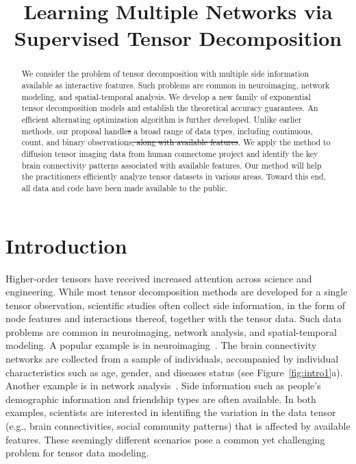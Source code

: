 \documentclass{article}
\title{Learning Multiple Networks via Supervised Tensor Decomposition}
\theoremstyle{definition}
\theoremstyle{definition}
\providecommand{\DIFaddtex}[1]{{\protect\color{blue}\uwave{#1}}} %
\providecommand{\DIFdeltex}[1]{{\protect\color{red}\sout{#1}}}                      %
\providecommand{\DIFadd}[1]{{\DIFaddtex{#1}}} %
\providecommand{\DIFdel}[1]{{\DIFdeltex{#1}}} %
\begin{document}
\maketitle

\begin{abstract}
We consider the problem of tensor decomposition with multiple side information available as interactive features. Such problems are common in neuroimaging, network modeling, and spatial-temporal analysis. We develop a new family of exponential tensor decomposition models and establish the theoretical accuracy guarantees. An efficient alternating optimization algorithm is further developed. Unlike earlier methods, our proposal \DIFadd{is able to} handle\DIFdel{s} a broad range of data types, including continuous, count, and binary observations\DIFdel{, along with available features}. We apply the method to diffusion tensor imaging data from human connectome project and identify the key brain connectivity patterns associated with available features. Our method will help the practitioners efficiently analyze tensor datasets in various areas. Toward this end, all data and code have been made available to the public. 
\end{abstract}

\section{Introduction}
 Higher-order tensors have received increased attention across science and engineering. While most tensor decomposition methods are developed for a single tensor observation, scientific studies often collect side information, in the form of node features and interactions thereof, together with the tensor data. Such data problems are common in neuroimaging, network analysis, and spatial-temporal modeling. A popular example is in neuroimaging~\citep{zhou2013tensor}. The brain connectivity networks are collected from a sample of individuals, accompanied by individual characteristics such as age, gender, and diseases status (see Figure~\ref{fig:intro1}a). Another example is in network analysis~\citep{pmlr-v108-berthet20a}. Side information such as people’s demographic information and friendship types are often available. In both examples, scientists are interested in identifing the variation in the data tensor (e.g., brain connectivities, social community patterns) that is affected by available features. These seemingly different scenarios pose a common yet challenging problem for tensor data modeling. 
 
\end{document}
